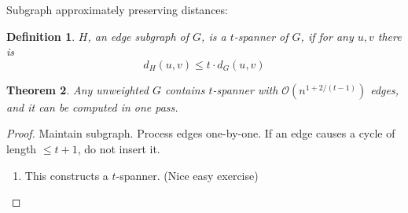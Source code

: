 \documentclass[11pt]{article}
\newtheorem{theorem}{Theorem}
\newtheorem{definition}[theorem]{Definition}
\newcommand{\bigo}{\mathcal{O}}
\begin{document}
Subgraph approximately preserving distances:

\begin{definition}
$H$, an edge subgraph of $G$, is a $t$-spanner of $G$, if for any $u,v$ there is
$$d_H(u,v) \le t \cdot d_G(u,v)$$
\end{definition}

\begin{theorem}
Any unweighted $G$ contains $t$-spanner with $\bigo(n^{1+2/(t-1)})$ edges, and it can be computed in one pass.
\end{theorem}
\begin{proof}
Maintain subgraph. Process edges one-by-one. If an edge causes a cycle of length $\le t+1$, do not insert it.
\begin{enumerate}
\item This constructs a $t$-spanner. (Nice easy exercise) \\


\end{enumerate}
\end{proof}
\end{document}
